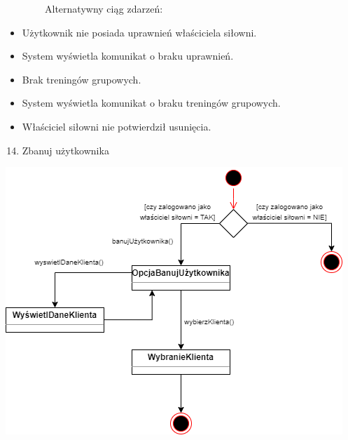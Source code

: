 {~~~~~~~~Alternatywny ciąg zdarzeń:}

\begin{itemize}
\tightlist
\item
  {Użytkownik nie posiada uprawnień właściciela siłowni.}
\end{itemize}

\begin{itemize}
\tightlist
\item
  {System wyświetla komunikat o braku uprawnień.}
\end{itemize}

\begin{itemize}
\tightlist
\item
  {Brak treningów grupowych.}
\end{itemize}

\begin{itemize}
\tightlist
\item
  {System wyświetla komunikat o braku treningów grupowych.}
\end{itemize}

\begin{itemize}
\tightlist
\item
  {Właściciel siłowni nie potwierdził usunięcia.\\
  }
\end{itemize}

\begin{enumerate}
\setcounter{enumi}{13}
\tightlist
\item
  {Zbanuj użytkownika}
\end{enumerate}

{\includegraphics{../diagrams/state/zbanuj_uzytkownika}}

